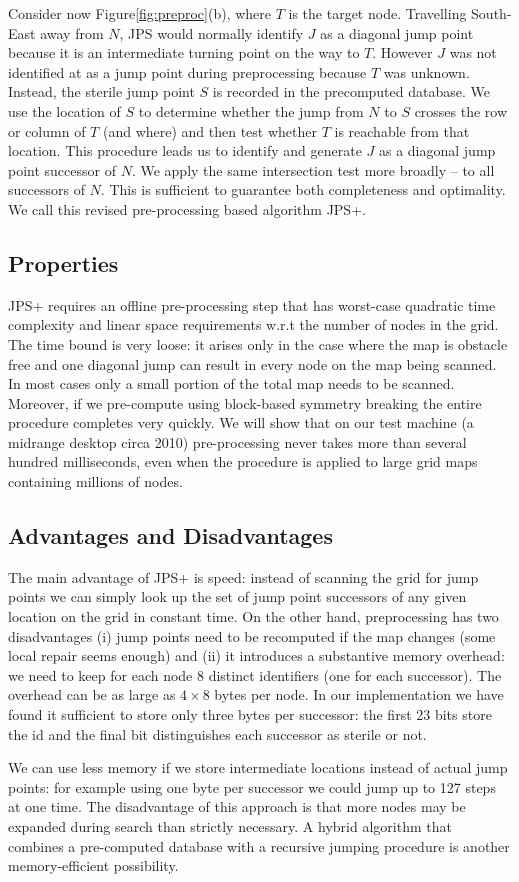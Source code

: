 Consider now Figure\ref{fig:preproc}(b), where $T$ is the target node.  
Travelling South-East away from $N$, JPS would normally identify 
$J$ as a diagonal jump point because it is an intermediate turning
point on the way to $T$.
However $J$ was not identified at as a jump point during preprocessing 
because $T$ was unknown.  
Instead, the sterile jump point $S$ is recorded in the precomputed 
database. We use the location of $S$ to determine whether the jump from 
$N$ to $S$ crosses the row or column of $T$ (and where) and then test 
whether $T$ is reachable from that location. This procedure 
leads us to identify and generate $J$ as a diagonal jump point successor
of $N$. We apply the same intersection test more broadly -- to all 
successors of $N$. This is sufficient to guarantee both completeness 
and optimality. We call this revised pre-processing based algorithm 
JPS+.
\subsection*{Properties}
JPS+ requires an offline pre-processing step that has worst-case quadratic 
time complexity and linear space requirements w.r.t the number of nodes in 
the grid. The time bound is very loose: it arises only in the case 
where the map is obstacle free and one diagonal jump can result in
every node on the map being scanned. In most cases only a small portion
of the total map needs to be scanned. Moreover, if we pre-compute using block-based 
symmetry breaking the entire procedure completes very quickly.
We will show that on our test machine (a midrange desktop
circa 2010) pre-processing never takes more than several hundred milliseconds,
even when the procedure is applied to large grid maps containing millions
of nodes.
\subsection*{Advantages and Disadvantages}
The main advantage of JPS+ is speed: instead of scanning the grid for
jump points we can simply look up the set of jump point successors
of any given location on the grid in constant time.
On the other hand, preprocessing has two disadvantages (i) jump points need to be recomputed
if the map changes (some local repair seems enough) and (ii) it introduces 
a substantive memory overhead: we need to keep for each node 8 distinct 
identifiers (one for each successor). 
The overhead can be as large as $4\times8$ bytes per node. In our
implementation we have found it sufficient to store only three bytes 
per successor: the first 23 bits store the id and the final bit distinguishes
each successor as sterile or not. 
\par
We can use less memory if we
store intermediate locations instead of actual jump points: for example
using one byte per successor we could jump up to 127 steps 
at one time. The disadvantage of this approach is that more nodes may be 
expanded during search than strictly necessary. A hybrid 
algorithm that combines a pre-computed database with a recursive
jumping procedure is another memory-efficient possibility.
